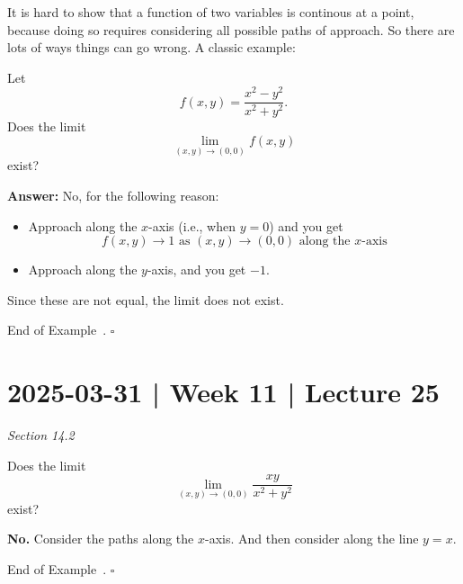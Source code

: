 \documentclass[10pt]{article}
\theoremstyle{definition}
\newtheorem{example}[theorem]{Example}
\renewenvironment{example}
{\begin{oldexample}}
  {\par\smallskip\hfill   End of Example~\theexample. $\square$    \par\end{oldexample}}
\newcommand{\vt}{\vskip 5mm} %
\newcommand{\Fl}{\vt\noindent\textbf} %
\newcommand{\1}[1]{\textbf{1}_{\left[#1\right]}} %
\begin{document}
It is hard to show that a function of two variables is continous at a point,
because doing so requires considering all possible paths of approach. So there
are lots of ways things can go wrong. A classic example:

\begin{example}
  \label{ex:aaa}
  Let
  \begin{equation*}
    f(x,y) = \frac{x^{2}-y^{2}}{x^{2}+y^{2}}.
  \end{equation*}
  Does the limit
  \begin{equation*}
    \lim_{(x,y)\to (0,0)}f(x,y) 
  \end{equation*}
  exist?

  \Fl{Answer:} No, for the following reason:
  \begin{itemize}
    \item Approach along the $x$-axis (i.e., when $y=0$) and you get
    \begin{equation*}
      f(x,y) \to 1 \text{ as } (x,y)\to (0,0) \text{ along the $x$-axis}
    \end{equation*}
    \item Approach along the $y$-axis, and you get $-1$.
  \end{itemize}
  Since these are not equal, the limit does not exist.
\end{example}

\newpage
\section{2025-03-31 | Week 11 | Lecture 25}
\textit{Section 14.2}
\begin{example}
  Does the limit
  \begin{equation*}
    \lim_{(x,y)\to (0,0)} \frac{xy}{x^{2}+y^{2}}
  \end{equation*}
  exist?

  \Fl{No.} Consider the paths along the $x$-axis. And then consider along the
  line $y=x$.
\end{example}
\end{document}
